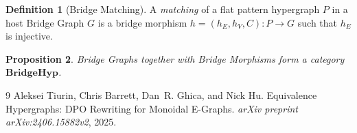\documentclass[11pt,a4paper]{article}
\theoremstyle{definition}
\newtheorem{definition}{Definition}[section]
\theoremstyle{plain}
\newtheorem{proposition}[definition]{Proposition}
\begin{document}
\begin{definition}[Bridge Matching]
A \emph{matching} of a flat pattern hypergraph $P$ in a host Bridge Graph $G$ is a bridge morphism $h = (h_E, h_V, C) \colon P \to G$ such that $h_E$ is injective.
\end{definition}

\begin{proposition}
Bridge Graphs together with Bridge Morphisms form a category $\mathbf{BridgeHyp}$.
\end{proposition}


\begin{thebibliography}{9}
Aleksei Tiurin, Chris Barrett, Dan~R. Ghica, and Nick Hu.
\newblock Equivalence Hypergraphs: DPO Rewriting for Monoidal E-Graphs.
\newblock \emph{arXiv preprint arXiv:2406.15882v2}, 2025.
\end{thebibliography}
\end{document}
